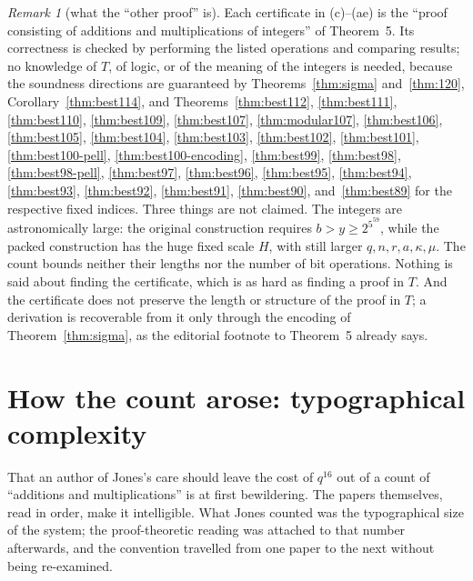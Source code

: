 \documentclass[11pt,letterpaper]{article}
\theoremstyle{definition}
\theoremstyle{remark}
\newtheorem{remark}[theorem]{Remark}
\numberwithin{equation}{section}
\begin{document}
\begin{remark}[what the ``other proof'' is]
Each certificate in (c)--(ae) is the ``proof consisting of additions and
multiplications of integers'' of Theorem~5. Its correctness is checked by
performing the listed operations and comparing results; no knowledge of $T$,
of logic, or of the meaning of the integers is needed, because the
soundness directions are guaranteed by Theorems~\ref{thm:sigma}
and~\ref{thm:120}, Corollary~\ref{thm:best114}, and
Theorems~\ref{thm:best112}, \ref{thm:best111}, \ref{thm:best110},
\ref{thm:best109}, \ref{thm:best107}, \ref{thm:modular107},
\ref{thm:best106}, \ref{thm:best105}, \ref{thm:best104},
\ref{thm:best103}, \ref{thm:best102}, \ref{thm:best101},
\ref{thm:best100-pell}, \ref{thm:best100-encoding}, \ref{thm:best99},
\ref{thm:best98}, \ref{thm:best98-pell}, \ref{thm:best97}, \ref{thm:best96},
\ref{thm:best95}, \ref{thm:best94}, \ref{thm:best93}, \ref{thm:best92},
\ref{thm:best91}, \ref{thm:best90}, and~\ref{thm:best89}
for the respective fixed
indices. Three things are not
claimed. The integers are astronomically large: the original construction
requires $b>y\ge2^{5^{59}}$, while the packed construction has the huge
fixed scale $H$, with still larger $q,n,r,a,\kappa,\mu$. The count bounds neither their lengths nor
the number of bit operations. Nothing is said about finding the certificate,
which is as hard as finding a proof in $T$. And the certificate does not
preserve the length or structure of the proof in $T$; a derivation is
recoverable from it only through the encoding of Theorem~\ref{thm:sigma},
as the editorial footnote to Theorem~5 already says.
\end{remark}

\section{How the count arose: typographical complexity}\label{sec:typo}

That an author of Jones's care should leave the cost of $q^{16}$ out of a
count of ``additions and multiplications'' is at first bewildering. The
papers themselves, read in order, make it intelligible. What Jones counted
was the typographical size of the system; the proof-theoretic reading was
attached to that number afterwards, and the convention travelled from one
paper to the next without being re-examined.
\end{document}
